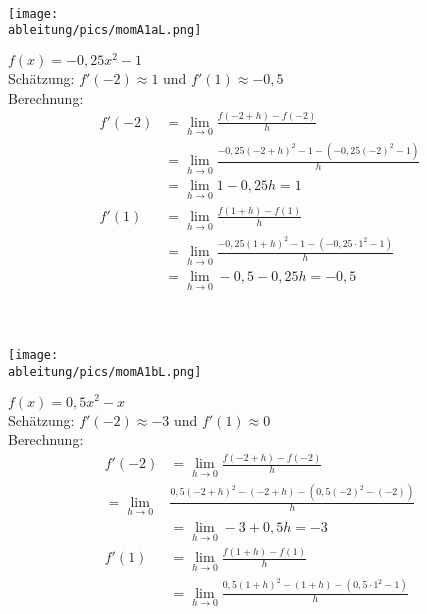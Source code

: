 \begin{Answer}[ref=momA1]\\
	\begin{minipage}{\textwidth}
		\begin{minipage}{0.49\textwidth}
			\centering\texttt{[image: \\ableitung/pics/momA1aL.png]}\\
		\end{minipage}
		\begin{minipage}{0.49\textwidth}
			\(f(x)=-0,25x^2-1\)\\
			Schätzung: \(f'(-2)\approx1\) und \(f'(1)\approx-0,5\)\\
			Berechnung:
			\begin{align*}
				f'(-2)&=\lim\limits_{h\to 0}\frac{f(-2+h)-f(-2)}{h}\\
				&=\lim\limits_{h\to 0}\frac{-0,25(-2+h)^2-1-(-0,25(-2)^2-1)}{h}\\
				&=\lim\limits_{h\to 0}1-0,25h=1\\
				f'(1)&=\lim\limits_{h\to 0}\frac{f(1+h)-f(1)}{h}\\
				&=\lim\limits_{h\to 0}\frac{-0,25(1+h)^2-1-(-0,25\cdot 1^2-1)}{h}\\
				&=\lim\limits_{h\to 0}-0,5-0,25h=-0,5\\
			\end{align*}
		\end{minipage}
	\end{minipage}
	\phantom{text}\\
	\begin{minipage}{\textwidth}
		\begin{minipage}{0.49\textwidth}
			\centering\texttt{[image: \\ableitung/pics/momA1bL.png]}\\
		\end{minipage}
		\begin{minipage}{0.49\textwidth}
			\(f(x)=0,5x^2-x\)\\
			Schätzung: \(f'(-2)\approx-3\) und \(f'(1)\approx0\)\\
			Berechnung:
			\begin{align*}
				f'(-2)&=\lim\limits_{h\to 0}\frac{f(-2+h)-f(-2)}{h}\\
				=\lim\limits_{h\to 0}&\frac{0,5(-2+h)^2-(-2+h)-(0,5(-2)^2-(-2))}{h}\\
				&=\lim\limits_{h\to 0}-3+0,5h=-3\\
				f'(1)&=\lim\limits_{h\to 0}\frac{f(1+h)-f(1)}{h}\\
				&=\lim\limits_{h\to 0}\frac{0,5(1+h)^2-(1+h)-(0,5\cdot 1^2-1)}{h}\\

\end{align*}
\end{minipage}
\end{minipage}
\end{Answer}
